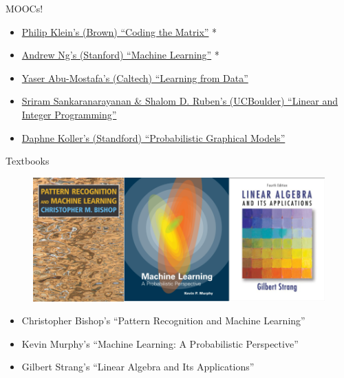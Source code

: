 \documentclass[ignorenonframetext,]{beamer}
\begin{document}
\begin{frame}{MOOCs!}

\begin{itemize}
\itemsep1pt\parskip0pt
\item
  \href{https://www.coursera.org/course/matrix}{Philip Klein's (Brown)
  ``Coding the Matrix''} *
\item
  \href{https://class.coursera.org/ml-005/lecture/preview}{Andrew Ng's
  (Stanford) ``Machine Learning''} *
\item
  \href{https://work.caltech.edu/telecourse.html}{Yaser Abu-Mostafa's
  (Caltech) ``Learning from Data''}
\item
  \href{https://www.coursera.org/course/linearprogramming}{Sriram
  Sankaranarayanan \& Shalom D. Ruben's (UCBoulder) ``Linear and Integer
  Programming''}
\item
  \href{https://www.coursera.org/course/pgm}{Daphne Koller's (Standford)
  ``Probabilistic Graphical Models''}
\end{itemize}

\end{frame}

\begin{frame}{Textbooks}

\begin{figure}[htbp]
\centering
\includegraphics{assets/presentation/GIML/books.png}
\caption{}
\end{figure}

\begin{itemize}
\itemsep1pt\parskip0pt
\item
  Christopher Bishop's ``Pattern Recognition and Machine Learning''
\item
  Kevin Murphy's ``Machine Learning: A Probabilistic Perspective''
\item
  Gilbert Strang's ``Linear Algebra and Its Applications''
\end{itemize}

\end{frame}
\end{document}
